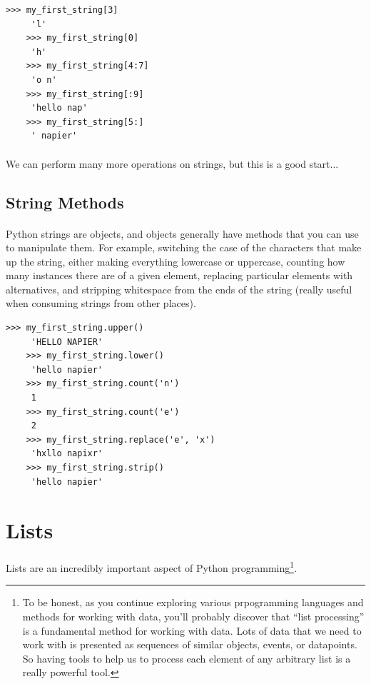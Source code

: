 \documentclass[12pt, a4paper, oneside]{book}
\begin{document}
{\begin{lstlisting}[style=DOS]
    >>> my_first_string[3]
     'l'
    >>> my_first_string[0]
     'h'
    >>> my_first_string[4:7]
     'o n'
    >>> my_first_string[:9]
     'hello nap'
    >>> my_first_string[5:]
     ' napier'
\end{lstlisting}

\paragraph{} We can perform many more operations on strings, but this is a good start...

\subsection{String Methods}
\paragraph{} Python strings are objects, and objects generally have methods that you can use to manipulate them. For example, switching the case of the characters that make up the string, either making everything lowercase or uppercase, counting how many instances there are of a given element, replacing particular elements with alternatives, and stripping whitespace from the ends of the string (really useful when consuming strings from other places).

\begin{lstlisting}[style=DOS]
    >>> my_first_string.upper()
     'HELLO NAPIER'
    >>> my_first_string.lower()
     'hello napier'
    >>> my_first_string.count('n')
     1
    >>> my_first_string.count('e')
     2
    >>> my_first_string.replace('e', 'x')
     'hxllo napixr'
    >>> my_first_string.strip()
     'hello napier'
\end{lstlisting}


\section{Lists}
\paragraph{} Lists are an incredibly important aspect of Python programming\footnote{To be honest, as you continue exploring various prpogramming languages and methods for working with data, you'll probably discover that ``list processing'' is a fundamental method for working with data. Lots of data that we need to work with is presented as sequences of similar objects, events, or datapoints. So having tools to help us to process each element of any arbitrary list is a really powerful tool.}.

}
\end{document}
